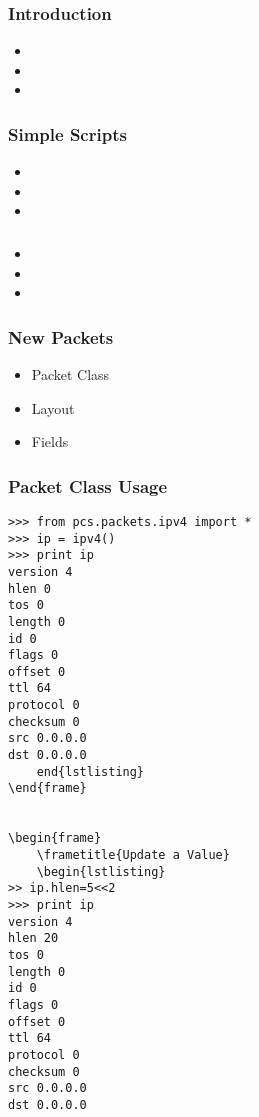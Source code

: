 \maketitle
\begin{frame}
	\frametitle{Introduction}
	\begin{itemize}
	\item
	\item
	\item
	\end{itemize}
\end{frame}

\begin{frame}
	\frametitle{Simple Scripts}
	\begin{itemize}
	\item
	\item
	\item
	\end{itemize}
\end{frame}

\begin{frame}
	\frametitle{}
	\begin{itemize}
	\item
	\item
	\item
	\end{itemize}
\end{frame}

\begin{frame}
	\frametitle{New Packets}
	\begin{itemize}
	\item Packet Class
	\item Layout
	\item Fields
	\end{itemize}
\end{frame}

\begin{frame}
	\frametitle{Packet Class Usage}
	\begin{lstlisting}
>>> from pcs.packets.ipv4 import *
>>> ip = ipv4()
>>> print ip
version 4
hlen 0
tos 0
length 0
id 0
flags 0
offset 0
ttl 64
protocol 0
checksum 0
src 0.0.0.0
dst 0.0.0.0
	end{lstlisting}
\end{frame}


\begin{frame}
	\frametitle{Update a Value}
	\begin{lstlisting}
>> ip.hlen=5<<2
>>> print ip
version 4
hlen 20
tos 0
length 0
id 0
flags 0
offset 0
ttl 64
protocol 0
checksum 0
src 0.0.0.0
dst 0.0.0.0
	\end{lstlisting}
\end{frame}

\begin{frame}
	\frametitle{}
	\begin{lstlisting}

	\end{lstlisting}
\end{frame}

\begin{frame}
	\frametitle{}
	\begin{lstlisting}

	\end{lstlisting}
\end{frame}



